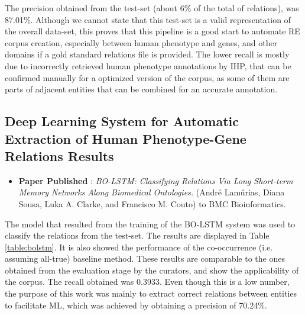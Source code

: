 \documentclass[11pt]{article}
\begin{document}
The precision obtained from the test-set (about 6\% of the total of relations), was 87.01\%. Although we cannot state that this test-set is a valid representation of the overall data-set, this proves that this pipeline is a good start to automate RE corpus creation, especially between human phenotype and genes, and other domains if a gold standard relations file is provided. The lower recall is mostly due to incorrectly retrieved human phenotype annotations by IHP, that can be confirmed manually for a optimized version of the corpus, as some of them are parts of adjacent entities that can be combined for an accurate annotation. 


\subsection{Deep Learning System for Automatic Extraction of Human Phenotype-Gene Relations Results}

\begin{itemize}

\item{\textbf{Paper Published} \cite{BOLSTM}: \textit{BO-LSTM: Classifying Relations Via Long
Short-term Memory Networks Along Biomedical Ontologies.} (André Lamúrias, Diana Sousa, Luka A. Clarke, and Francisco M. Couto) to BMC Bioinformatics.}

\end{itemize}

 The model that resulted from the training of the BO-LSTM system was used to classify the relations from the test-set. The results are displayed in Table \ref{table:bolstm}. It is also showed the performance of the co-occurrence (i.e. assuming all-true) baseline method. These results are comparable to the ones obtained from the evaluation stage by the curators, and show the applicability of the corpus. The recall obtained was 0.3933. Even though this is a low number, the purpose of this work was mainly to extract correct relations between entities to facilitate ML, which was achieved by obtaining a precision of 70.24\%.
 
\end{document}
